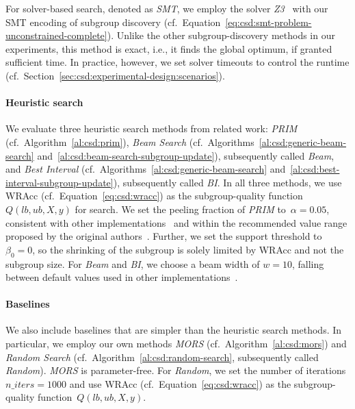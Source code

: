 \documentclass{article}
\theoremstyle{definition}
\begin{document}
For solver-based search, denoted as \emph{SMT}, we employ the solver \emph{Z3}~\cite{bjorner2015nuz, deMoura2008z3} with our SMT encoding of subgroup discovery (cf.~Equation~\ref{eq:csd:smt-problem-unconstrained-complete}).
Unlike the other subgroup-discovery methods in our experiments, this method is exact, i.e., it finds the global optimum, if granted sufficient time.
In practice, however, we set solver timeouts to control the runtime (cf.~Section~\ref{sec:csd:experimental-design:scenarios}).

\paragraph{Heuristic search}

We evaluate three heuristic search methods from related work:
\emph{PRIM} (cf.~Algorithm~\ref{al:csd:prim}), \emph{Beam Search} (cf.~Algorithms~\ref{al:csd:generic-beam-search} and~\ref{al:csd:beam-search-subgroup-update}), subsequently called \emph{Beam}, and \emph{Best Interval} (cf.~Algorithms~\ref{al:csd:generic-beam-search} and~\ref{al:csd:best-interval-subgroup-update}), subsequently called \emph{BI}.
In all three methods, we use WRAcc (cf.~Equation~\ref{eq:csd:wracc}) as the subgroup-quality function~$Q(\mathit{lb}, \mathit{ub}, X, y)$ for search.
We set the peeling fraction of \emph{PRIM} to~$\alpha = 0.05$, consistent with other implementations~\cite{arzamasov2021reds, kwakkel2017exploratory} and within the recommended value range proposed by the original authors~\cite{friedman1999bump}.
Further, we set the support threshold to~$\beta_0 = 0$, so the shrinking of the subgroup is solely limited by WRAcc and not the subgroup size.
For \emph{Beam} and \emph{BI}, we choose a beam width of $w=10$, falling between default values used in other implementations~\cite{arzamasov2021reds, lemmerich2019pysubgroup}.

\paragraph{Baselines}

We also include baselines that are simpler than the heuristic search methods.
In particular, we employ our own methods \emph{MORS} (cf.~Algorithm~\ref{al:csd:mors}) and \emph{Random Search} (cf.~Algorithm~\ref{al:csd:random-search}, subsequently called \emph{Random}).
\emph{MORS} is parameter-free.
For \emph{Random}, we set the number of iterations $\mathit{n\_iters} = 1000$ and use WRAcc (cf.~Equation~\ref{eq:csd:wracc}) as the subgroup-quality function~$Q(\mathit{lb}, \mathit{ub}, X, y)$.
\end{document}
